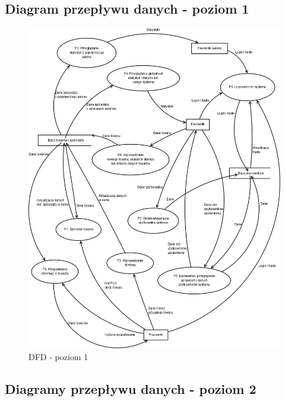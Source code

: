 \subsection{Diagram przepływu danych - poziom 1}
\begin{figure}[h]
\includegraphics[width=1\textwidth]{gfx/dfd-1.png}
\caption{DFD - poziom 1}
\end{figure}
\clearpage
\subsection{Diagramy przepływu danych - poziom 2}
